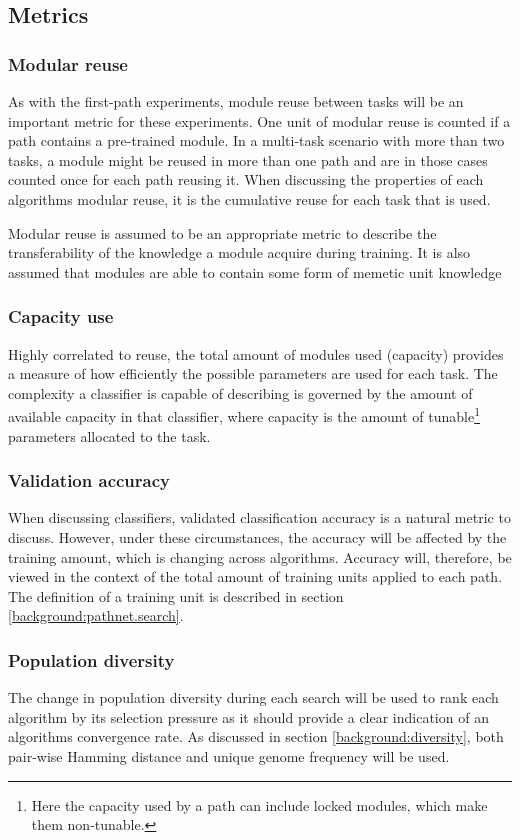 \subsection{Metrics}
\label{exp2:metrics}

\subsubsection{Modular reuse}
As with the first-path experiments, module reuse between tasks will be an important metric for these experiments. One unit of modular reuse is counted if a path contains a pre-trained module. In a multi-task scenario with more than two tasks, a module might be reused in more than one path and are in those cases counted once for each path reusing it. When discussing the properties of each algorithms modular reuse, it is the cumulative reuse for each task that is used.

Modular reuse is assumed to be an appropriate metric to describe the transferability of the knowledge a module acquire during training. It is also assumed that modules are able to contain some form of memetic unit knowledge

\subsubsection{Capacity use}
Highly correlated to reuse, the total amount of modules used (capacity) provides a measure of how efficiently the possible parameters are used for each task. The complexity a classifier is capable of describing is governed by the amount of available capacity in that classifier, where capacity is the amount of tunable\footnote{Here the capacity used by a path can include locked modules, which make them non-tunable.} parameters allocated to the task.

\subsubsection{Validation accuracy}
When discussing classifiers, validated classification accuracy is a natural metric to discuss. However, under these circumstances, the accuracy will be affected by the training amount, which is changing across algorithms. Accuracy will, therefore, be viewed in the context of the total amount of training units applied to each path. The definition of a training unit is described in section \ref{background:pathnet.search}.

\subsubsection{Population diversity}
The change in population diversity during each search will be used to rank each algorithm by its selection pressure as it should provide a clear indication of an algorithms convergence rate. As discussed in section \ref{background:diversity}, both pair-wise Hamming distance and unique genome frequency will be used.

